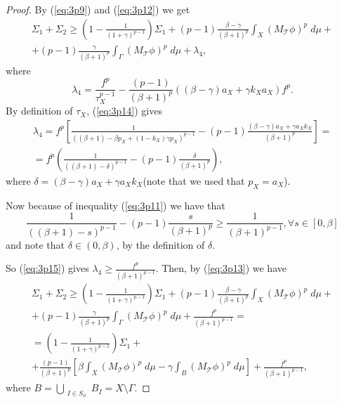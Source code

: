 \documentclass[10pt,a4paper]{amsart}
\newcommand{\mc}[1]{\mathcal{#1}}
\begin{document}
\begin{proof}
By (\ref{eq:3p9}) and (\ref{eq:3p12}) we get
\begin{multline} \label{eq:3p13}
\Sigma_1+\Sigma_2\geq \left(1-\frac{1}{(1+\gamma)^{p-1}} \right)\Sigma_1+ (p-1)\frac{\beta-\gamma}{(\beta +1)^p}\int_X \left(M_{\mc T}\phi \right)^p\; d\mu +\\
+ (p-1)\frac{\gamma}{(\beta +1)^p}\int_{\Gamma} \left(M_{\mc T}\phi \right)^p\; d\mu + \lambda_4,
\end{multline}
where
\begin{equation}\label{eq:3p14}
\lambda_4= \frac{f^p}{\tau_X^{p-1}}-\frac{(p-1)}{(\beta +1)^p}\left( (\beta - \gamma)a_X+\gamma k_X a_X \right)f^p.
\end{equation}
By definition of $\tau_X$, (\ref{eq:3p14}) gives
\begin{multline} \label{eq:3p15}
\lambda_4= f^p \left[\frac{1}{\left((\beta+1)-\beta p_X+ (1-k_X)\gamma p_X \right)^{p-1}}-(p-1)\frac{(\beta-\gamma)a_X+\gamma a_X k_X}{(\beta +1)^p} \right]=\\
=f^p \left( \frac{1}{\left( (\beta+1)-\delta \right)^{p-1}} -(p-1) \frac{\delta}{(\beta +1)^p}\right),
\end{multline}
where $\delta=(\beta-\gamma)a_X+\gamma a_X k_X$(note that we used that $p_X=a_X$).

Now because of inequality (\ref{eq:3p11}) we have that
\[
\frac{1}{\left( (\beta+1)-s \right)^{p-1}} -(p-1) \frac{s}{(\beta +1)^p}\geq \frac{1}{(\beta +1)^{p-1}}, \forall s\in[0,\beta]
\]
and note that $\delta\in (0,\beta)$, by the definition of $\delta$.

So (\ref{eq:3p15}) gives $\lambda_4 \geq \frac{f^p}{(\beta+1)^{p-1}}$. Then, by (\ref{eq:3p13}) we have
\begin{multline} \label{eq:3p16}
\Sigma_1+\Sigma_2 \geq \left( 1-\frac{1}{(1+\gamma)^{p-1}} \right)\Sigma_1+(p-1)\frac{\beta-\gamma}{(\beta+1)^p}\int_X \left( M_{\mc T}\phi \right)^p\;d\mu +\\
+ (p-1)\frac{\gamma}{(\beta+1)^p}\int_{\Gamma} \left( M_{\mc T}\phi \right)^p\;d\mu+\frac{f^p}{(\beta+1)^{p-1}}=\\
=\left( 1-\frac{1}{(1+\gamma)^{p-1}} \right)\Sigma_1+\\
+\frac{(p-1)}{(\beta+1)^p} \left[ \beta \int_X \left( M_{\mc T}\phi \right)^p\;d\mu -\gamma \int_B \left( M_{\mc T}\phi \right)^p\;d\mu \right] + \frac{f^p}{(\beta+1)^{p-1}},
\end{multline}
where $B=\bigcup_{\substack{I\in S_\phi}}B_I=X\setminus\Gamma$.


\end{proof}
\end{document}
